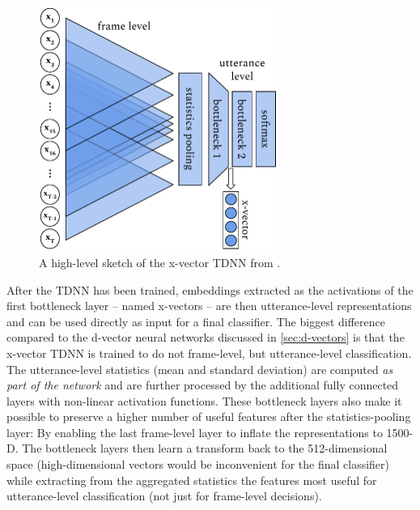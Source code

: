 \documentclass[bsc,frontabs,twoside,singlespacing,parskip,deptreport]{infthesis}
\begin{document}
{{    \begin{figure}[h!t]
      \centering
      \includegraphics[height=8cm]{graphics/x-vectors-hl}
      \caption{A high-level sketch of the x-vector TDNN from \citeauthor{Snyder_et_al_2018}.}
      \label{fig:x-vectors-hl}
    \end{figure}
    After the TDNN has been trained, embeddings extracted as the activations of the first bottleneck layer -- named x-vectors -- are then utterance-level representations and can be used directly as input for a final classifier. The biggest difference compared to the d-vector neural networks discussed in \autoref{sec:d-vectors} is that the x-vector TDNN is trained to do not frame-level, but utterance-level classification. The utterance-level statistics (mean and standard deviation) are computed \textit{as part of the network} and are further processed by the additional fully connected layers with non-linear activation functions. These bottleneck layers also make it possible to preserve a higher number of useful features after the statistics-pooling layer: By enabling the last frame-level layer to inflate the representations to 1500-D. The bottleneck layers then learn a transform back to the 512-dimensional space (high-dimensional vectors would be inconvenient for the final classifier) while extracting from the aggregated statistics the features most useful for utterance-level classification (not just for frame-level decisions).

}}
\end{document}
